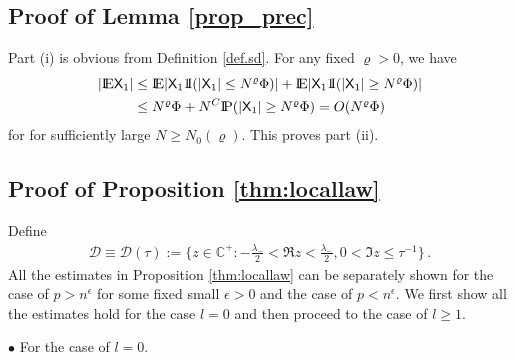 \documentclass[12pt]{article}
\numberwithin{equation}{section}
\newtheorem{myPro}{Proof}
\theoremstyle{remark}
\newcommand{\p}{{\rm I}\kern-0.18em{\rm P}}
\newcommand{\1}{{\rm 1}\kern-0.24em{\rm I}}
\newcommand{\E}{{\rm I}\kern-0.18em{\rm E}}
\begin{document}
\begin{appendices}
\subsection{Proof of Lemma \ref{prop_prec}}
	Part (i) is obvious from Definition \ref{def.sd}. For any fixed $\varrho>0$, we have
\begin{align*}
	|\E \mathsf{X}_1| &\leq \E |\mathsf{X}_1\1(| \mathsf{X}_1|\leq  N^{\varrho}\Phi)|+\E |\mathsf{X}_1\1(|\mathsf{X}_1|\geq  N^{\varrho}\Phi)|\nonumber\\
	&\leq N^{\varrho}\Phi+ N^C \p(|\mathsf{X}_1|\geq N^{\varrho}\Phi)=O(N^{\varrho}\Phi)
\end{align*}
	for for sufficiently large $N\geq N_0(\varrho)$. This proves part (ii). 



\subsection{Proof of Proposition \ref{thm:locallaw}}
Define
\begin{align}\label{19071810}
\mathcal{D}\equiv\mathcal{D}(\tau):= \{ z\in \mathbb{C}^+: -\frac{\lambda_-}{2} <\Re{z} <\frac{\lambda_-}{2} , 0< \Im{z}\leq \tau^{-1}\}\,.
\end{align}
 All the estimates in Proposition  \ref{thm:locallaw} can be separately shown for the case of $p>n^{\epsilon}$ for some fixed small $\epsilon>0$ and the case  of $p< n^{\epsilon}$. We first show all the estimates hold for the case $l=0$ and then proceed to the case of $l\geq 1$.

\vspace{0.2cm}
\noindent$\bullet$ For the case of $l=0$.
\vspace{0.2cm}


\end{appendices}
\end{document}
